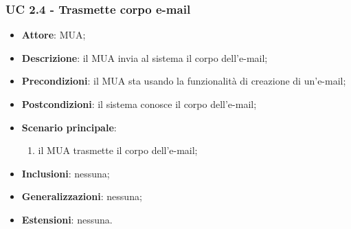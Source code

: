     \subsubsection{UC 2.4 - Trasmette corpo e-mail} \label{sec:UC2.4}
    \begin{itemize}
        \item \textbf{Attore}: MUA;
        \item \textbf{Descrizione}: il MUA invia al sistema il corpo dell'e-mail;
        \item \textbf{Precondizioni}: il MUA sta usando la funzionalità di creazione di un'e-mail;
        \item \textbf{Postcondizioni}: il sistema conosce il corpo dell'e-mail;
        \item \textbf{Scenario principale}:
            \begin{enumerate}
                \item il MUA trasmette il corpo dell'e-mail;
            \end{enumerate}
        \item \textbf{Inclusioni}: nessuna;
        \item \textbf{Generalizzazioni}: nessuna;
        \item \textbf{Estensioni}: nessuna.
    \end{itemize}

